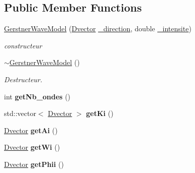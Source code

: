 \subsection*{Public Member Functions}
\begin{DoxyCompactItemize}
\item 
\hyperlink{classGerstnerWaveModel_a9b4ecbbc3abf2d9a9a66f95a28c5927d}{Gerstner\-Wave\-Model} (\hyperlink{classDvector}{Dvector} \hyperlink{classWaveModel_ab0ce1c49c362d60e89cef37e49cafb78}{\-\_\-direction}, double \hyperlink{classWaveModel_acbfbba2af6232fd3089615ab795a895e}{\-\_\-intensite})
\begin{DoxyCompactList}\small\item\em constructeur \end{DoxyCompactList}\item 
\hypertarget{classGerstnerWaveModel_ae14149452ec3a38f6e7b01eda5a3f034}{\hyperlink{classGerstnerWaveModel_ae14149452ec3a38f6e7b01eda5a3f034}{$\sim$\-Gerstner\-Wave\-Model} ()}\label{classGerstnerWaveModel_ae14149452ec3a38f6e7b01eda5a3f034}

\begin{DoxyCompactList}\small\item\em Destructeur. \end{DoxyCompactList}\item 
\hypertarget{classGerstnerWaveModel_aa5dbcf564026561f9e52f51ca1145e7e}{int {\bfseries get\-Nb\-\_\-ondes} ()}\label{classGerstnerWaveModel_aa5dbcf564026561f9e52f51ca1145e7e}

\item 
\hypertarget{classGerstnerWaveModel_a9409c817e45f7dd59d747da8135a61df}{std\-::vector$<$ \hyperlink{classDvector}{Dvector} $>$ {\bfseries get\-Ki} ()}\label{classGerstnerWaveModel_a9409c817e45f7dd59d747da8135a61df}

\item 
\hypertarget{classGerstnerWaveModel_a600e58d818a72b452c51566034bf37a0}{\hyperlink{classDvector}{Dvector} {\bfseries get\-Ai} ()}\label{classGerstnerWaveModel_a600e58d818a72b452c51566034bf37a0}

\item 
\hypertarget{classGerstnerWaveModel_a42ef93fd820ce54bb30151dd52b5acde}{\hyperlink{classDvector}{Dvector} {\bfseries get\-Wi} ()}\label{classGerstnerWaveModel_a42ef93fd820ce54bb30151dd52b5acde}

\item 
\hypertarget{classGerstnerWaveModel_a7fa71c326d76c5402341d53dd842b908}{\hyperlink{classDvector}{Dvector} {\bfseries get\-Phii} ()}\label{classGerstnerWaveModel_a7fa71c326d76c5402341d53dd842b908}


\end{DoxyCompactItemize}
